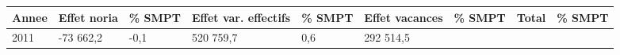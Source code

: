 \begin{longtable}[]{@{}lllllllll@{}}
\toprule
\begin{minipage}[b]{0.05\columnwidth}\raggedright
Annee\strut
\end{minipage} & \begin{minipage}[b]{0.10\columnwidth}\raggedright
Effet noria\strut
\end{minipage} & \begin{minipage}[b]{0.06\columnwidth}\raggedright
\% SMPT\strut
\end{minipage} & \begin{minipage}[b]{0.16\columnwidth}\raggedright
Effet var. effectifs\strut
\end{minipage} & \begin{minipage}[b]{0.06\columnwidth}\raggedright
\% SMPT\strut
\end{minipage} & \begin{minipage}[b]{0.12\columnwidth}\raggedright
Effet vacances\strut
\end{minipage} & \begin{minipage}[b]{0.06\columnwidth}\raggedright
\% SMPT\strut
\end{minipage} & \begin{minipage}[b]{0.10\columnwidth}\raggedright
Total\strut
\end{minipage} & \begin{minipage}[b]{0.06\columnwidth}\raggedright
\% SMPT\strut
\end{minipage}\tabularnewline
\midrule
\endhead
\begin{minipage}[t]{0.05\columnwidth}\raggedright
2011\strut
\end{minipage} & \begin{minipage}[t]{0.10\columnwidth}\raggedright
-73 662,2\strut
\end{minipage} & \begin{minipage}[t]{0.06\columnwidth}\raggedright
-0,1\strut
\end{minipage} & \begin{minipage}[t]{0.16\columnwidth}\raggedright
520 759,7\strut
\end{minipage} & \begin{minipage}[t]{0.06\columnwidth}\raggedright
0,6\strut
\end{minipage} & \begin{minipage}[t]{0.12\columnwidth}\raggedright
292 514,5\strut
\end{minipage} & \begin{minipage}[t]{0.06\columnwidth}\raggedright

\end{minipage}
\end{longtable}
